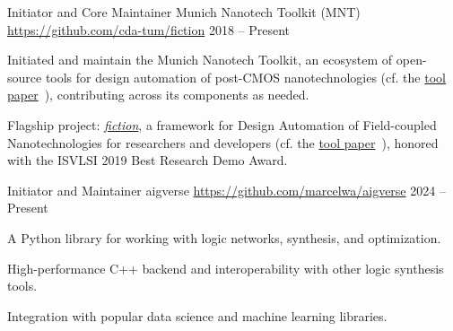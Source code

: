 

\begin{cventries}

  \cventry
    {Initiator and Core Maintainer} %
    {Munich Nanotech Toolkit (MNT)} %
    {\href{https://github.com/cda-tum/fiction}{https://github.com/cda-tum/fiction}} %
    {2018 -- Present} %
    {
      \begin{cvitems} %
        \item {Initiated and maintain the Munich Nanotech Toolkit, an ecosystem of open-source tools for design automation of post-CMOS nanotechnologies (cf. the \href{https://www.cda.cit.tum.de/files/eda/2024_ieee_nano_mnt.pdf}{tool paper}~\cite{nano_2024_8}), contributing across its components as needed.}
        \item {Flagship project: \href{https://github.com/cda-tum/fiction}{\emph{fiction}}, a framework for Design Automation of Field-coupled Nanotechnologies for researchers and developers (cf. the \href{https://arxiv.org/abs/1905.02477}{tool paper}~\cite{arXiv_fiction_2019_05_07}), honored with the ISVLSI 2019 Best Research Demo Award.}
      \end{cvitems}
    }

  \cventry
    {Initiator and Maintainer} %
    {aigverse} %
    {\href{https://github.com/marcelwa/aigverse}{https://github.com/marcelwa/aigverse}} %
    {2024 -- Present} %
    {
      \begin{cvitems} %
        \item {A Python library for working with logic networks, synthesis, and optimization.}
        \item {High-performance C++ backend and interoperability with other logic synthesis tools.}
        \item {Integration with popular data science and machine learning libraries.}
      \end{cvitems}
    }


\end{cventries}
